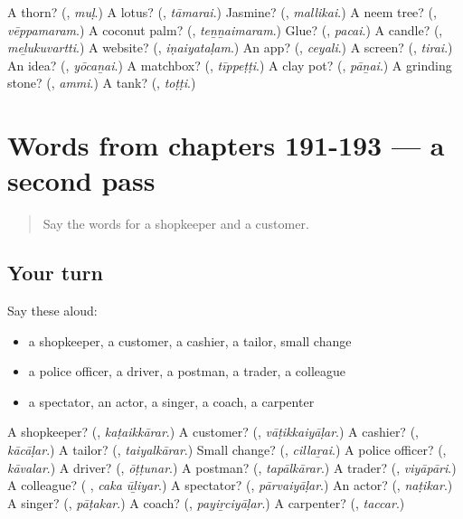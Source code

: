 \begin{tcolorbox}[breakable,colback=teal!4,colframe=teal!35!black,title={Before you move on}]
A thorn? (\textbf{}, \emph{muḷ}.) A lotus? (\textbf{}, \emph{tāmarai}.) Jasmine? (\textbf{}, \emph{mallikai}.) A neem tree? (\textbf{}, \emph{vēppamaram}.) A coconut palm? (\textbf{}, \emph{teṉṉaimaram}.) Glue? (\textbf{}, \emph{pacai}.) A candle? (\textbf{}, \emph{meḻukuvartti}.) A website? (\textbf{}, \emph{iṇaiyataḷam}.) An app? (\textbf{}, \emph{ceyali}.) A screen? (\textbf{}, \emph{tirai}.) An idea? (\textbf{}, \emph{yōcaṉai}.) A matchbox? (\textbf{}, \emph{tīppeṭṭi}.) A clay pot? (\textbf{}, \emph{pāṉai}.) A grinding stone? (\textbf{}, \emph{ammi}.) A tank? (\textbf{}, \emph{toṭṭi}.)
\end{tcolorbox}
\section[(dialogue)]{Words from chapters 191-193 — a second pass}

\label{lesson:TA-R193-second-pass-words-from-chapters-191-193}



\begin{quote}
Say the words for a shopkeeper and a customer.
\end{quote}

\subsection*{Your turn}
Say these aloud:

\begin{itemize}
\raggedright
  \item a shopkeeper, a customer, a cashier, a tailor, small change
  \item a police officer, a driver, a postman, a trader, a colleague
  \item a spectator, an actor, a singer, a coach, a carpenter
\end{itemize}

\begin{tcolorbox}[breakable,colback=teal!4,colframe=teal!35!black,title={Before you move on}]
A shopkeeper? (\textbf{}, \emph{kaṭaikkārar}.) A customer? (\textbf{}, \emph{vāṭikkaiyāḷar}.) A cashier? (\textbf{}, \emph{kācāḷar}.) A tailor? (\textbf{}, \emph{taiyalkārar}.) Small change? (\textbf{}, \emph{cillaṟai}.) A police officer? (\textbf{}, \emph{kāvalar}.) A driver? (\textbf{}, \emph{ōṭṭunar}.) A postman? (\textbf{}, \emph{tapālkārar}.) A trader? (\textbf{}, \emph{viyāpāri}.) A colleague? (\textbf{ }, \emph{caka ūḻiyar}.) A spectator? (\textbf{}, \emph{pārvaiyāḷar}.) An actor? (\textbf{}, \emph{naṭikar}.) A singer? (\textbf{}, \emph{pāṭakar}.) A coach? (\textbf{}, \emph{payiṟciyāḷar}.) A carpenter? (\textbf{}, \emph{taccar}.)
\end{tcolorbox}
